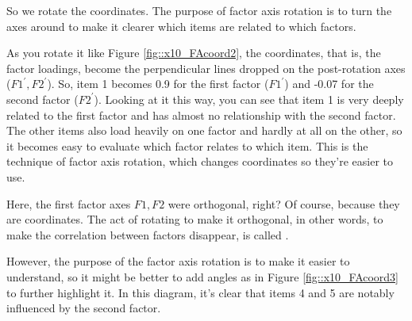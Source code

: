 \documentclass{ltjsbook}
\begin{document}
So we rotate the coordinates. The purpose of factor axis rotation is to turn the axes around to make it clearer which items are related to which factors.

As you rotate it like Figure \ref{fig::x10_FAcoord2}, the coordinates, that is, the factor loadings, become the perpendicular lines dropped on the post-rotation axes ($F1^\prime,F2^\prime$). So, item 1 becomes 0.9 for the first factor ($F1^\prime$) and -0.07 for the second factor ($F2^\prime$). Looking at it this way, you can see that item 1 is very deeply related to the first factor and has almost no relationship with the second factor. The other items also load heavily on one factor and hardly at all on the other, so it becomes easy to evaluate which factor relates to which item. This is the technique of factor axis rotation, which changes coordinates so they're easier to use.

Here, the first factor axes $F1, F2$ were orthogonal, right? Of course, because they are coordinates. The act of rotating to make it orthogonal, in other words, to make the correlation between factors disappear, is called .

However, the purpose of the factor axis rotation is to make it easier to understand, so it might be better to add angles as in Figure \ref{fig::x10_FAcoord3} to further highlight it. In this diagram, it's clear that items 4 and 5 are notably influenced by the second factor.

\end{document}
